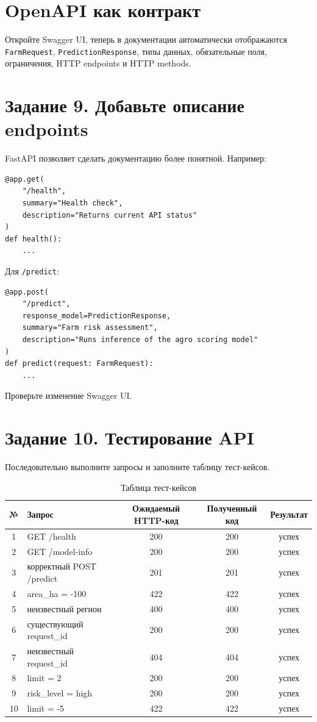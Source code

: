 \documentclass[12pt,a4paper]{article}
\begin{document}
\section{OpenAPI как контракт}

Откройте Swagger UI, теперь в документации автоматически отображаются \texttt{FarmRequest}, \texttt{PredictionResponse}, типы данных, обязательные поля, ограничения, HTTP endpoints и HTTP methods.

\section{Задание 9. Добавьте описание endpoints}

FastAPI позволяет сделать документацию более понятной. Например:

\begin{lstlisting}[caption={Описание /health}]
@app.get(
    "/health",
    summary="Health check",
    description="Returns current API status"
)
def health():
    ...
\end{lstlisting}

Для \texttt{/predict}:

\begin{lstlisting}[caption={Описание /predict}]
@app.post(
    "/predict",
    response_model=PredictionResponse,
    summary="Farm risk assessment",
    description="Runs inference of the agro scoring model"
)
def predict(request: FarmRequest):
    ...
\end{lstlisting}

Проверьте изменение Swagger UI.

\section{Задание 10. Тестирование API}

Последовательно выполните запросы и заполните таблицу тест-кейсов.

\begin{table}[H]
\centering
\caption{Таблица тест-кейсов}
\label{tab:test_cases}
\begin{tabular}{|c|p{5cm}|c|c|c|}
\hline
\textbf{№} & \textbf{Запрос} & \textbf{Ожидаемый HTTP-код} & \textbf{Полученный код} & \textbf{Результат} \\
\hline
1  & GET /health & 200 & 200 & успех \\
2  & GET /model-info & 200 & 200 & успех \\
3  & корректный POST /predict & 201 & 201 & успех \\
4  & area\_ha = -100 & 422 & 422 & успех \\
5  & неизвестный регион & 400 & 400 & успех \\
6  & существующий request\_id & 200 & 200 & успех \\
7  & неизвестный request\_id & 404 & 404 & успех \\
8  & limit = 2 & 200 & 200 & успех \\
9  & risk\_level = high & 200 & 200 & успех \\
10 & limit = -5 & 422 & 422 & успех \\
\hline
\end{tabular}
\end{table}
\end{document}
